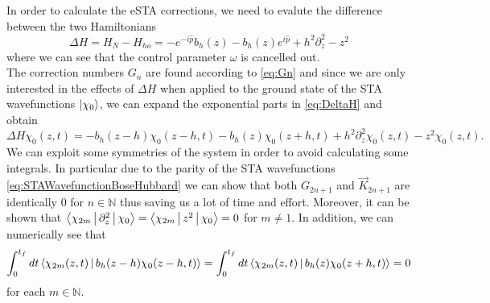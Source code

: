 In order to calculate the eSTA corrections, we need to evalute the difference between the two Hamiltonians
\begin{equation}
	\label{eq:DeltaH}
	\Delta H = H_{N} - H_{ho} =
	- e^{-i\hat{p}} b_{h}(z) - b_{h}(z)e^{i\hat{p}} + h^2 \partial_z^2 - z^2
\end{equation}
where we can see that the control parameter $ \omega $ is cancelled out.\\
The correction numbers $ G_{n} $ are found according to \cref{eq:Gn} and since we are only interested in the effects of $ \Delta H  $ when applied to the ground state of the STA wavefunctions $ \ket{\chi_{0}} $, we can expand the exponential parts in \cref{eq:DeltaH} and obtain
\begin{equation}
	\label{eq:DeltaHOnGroundState}
	\Delta H \chi_{0}(z,t) = - b_{h}(z-h)\chi_{0}(z-h,t) - b_{h}(z)\chi_{0}(z+h,t) + h^2\partial^2_{z}\chi_{0}(z,t) - z^2\chi_{0}(z,t).
\end{equation}
We can exploit some symmetries of the system in order to avoid calculating some integrals.
In particular due to the parity of the STA wavefunctions \cref{eq:STAWavefunctionBoseHubbard} we can show that both $ G_{2n+1} $ and $ \vec{K}_{2n +1} $ are identically 0 for $ n \in \mathbb{N} $ thus saving us a lot of time and effort.
Moreover, it can be shown that $ \Braket{\chi_{2m}|\partial_z^{2}|\chi_{0} } = \Braket{\chi_{2m}|z^{2}|\chi_{0} } = 0 $ for $ m \neq 1 $.
In addition, we can numerically see that
\begin{equation}
     \int_{0}^{t_{f}} dt 
        \Braket{
            \chi_{2m}(z,t)|b_{h}(z-h)\chi_{0}(z-h,t)} =
     \int_{0}^{t_{f}} dt 
        \Braket{\chi_{2m}(z,t)|b_{h}(z)\chi_{0}(z+h,t)} = 0
\end{equation}
for each $ m \in \mathbb{N} $.
